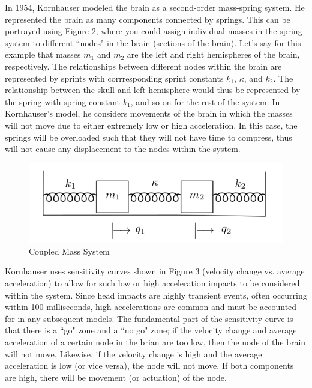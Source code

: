 \documentclass[%
 aip,
 amsmath,amssymb,
 reprint,%
 floatfix,%
]{revtex4-1}
\begin{document}
In 1954, Kornhauser modeled the brain as a second-order mass-spring system. He represented the brain as many components connected by springs. This can be portrayed using Figure 2, where you could assign individual masses in the spring system to different ``nodes" in the brain (sections of the brain). Let's say for this example that masses $m_1$ and $m_2$ are the left and right hemispheres of the brain, respectively. The relationships between different nodes within the brain are represented by sprints with corrresponding sprint constants $k_1$, $\kappa$, and $k_2$. The relationship between the skull and left hemisphere would thus be represented by the spring with spring constant $k_1$, and so on for the rest of the system. In Kornhauser's model, he considers movements of the brain in which the masses will not move due to either extremely low or high acceleration. In this case, the springs will be overloaded such that they will not have time to compress, thus will not cause any displacement to the nodes within the system.

\begin{figure}
	\centering
	\includegraphics[scale=0.4]{coupledmasssystem.png}
	\caption{Coupled Mass System\cite{Schramm2018}}
\end{figure}

Kornhauser uses sensitivity curves shown in Figure 3 (velocity change vs. average acceleration) to allow for such low or high acceleration impacts to be considered within the system. Since head impacts are highly transient events, often occurring within 100 milliseconds, high accelerations are common and must be accounted for in any subsequent models. The fundamental part of the sensitivity curve is that there is a ``go" zone and a ``no go" zone; if the velocity change and average acceleration of a certain node in the brian are too low, then the node of the brain will not move. Likewise, if the velocity change is high and the average acceleration is low (or vice versa), the node will not move. If both components are high, there will be movement (or actuation) of the node.
\end{document}
